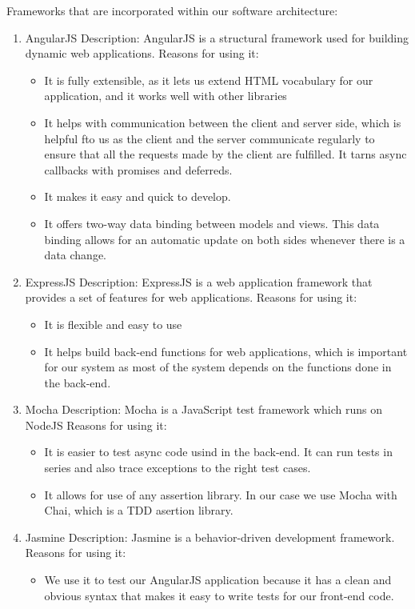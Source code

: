 Frameworks that are incorporated within our software architecture:
	\begin{enumerate}
		\item AngularJS
			Description: AngularJS is a structural framework used for building dynamic web applications.
			Reasons for using it:
			\begin{itemize}
				\item It is fully extensible, as it lets us extend HTML vocabulary for our application, and it works well with other libraries
				\item It helps with communication between the client and server side, which is helpful fto us as the client and the server communicate regularly to ensure that all the requests made by the client are fulfilled. It tarns async callbacks with promises and deferreds. 
				\item It makes it easy and quick to develop.
				\item It offers two-way data binding between models and views. This data binding allows for an automatic update on both sides whenever there is a data change.
			\end{itemize}
			
		\item ExpressJS
			Description: ExpressJS is a web application framework that provides a set of features for web applications.
			Reasons for using it:
			\begin{itemize}
				\item It is flexible and easy to use
				\item It helps build back-end functions for web applications, which is important for our system as most of the system depends on the functions done in the back-end.
			\end{itemize}
			
		\item Mocha 
			Description: Mocha is a JavaScript test framework which runs on NodeJS
			Reasons for using it:
			\begin{itemize}
				\item It is easier to test async code usind in the back-end. It can run tests in series and also trace exceptions to the right test cases.
				\item It allows for use of any assertion library. In our case we use Mocha with Chai, which is a TDD asertion library.
			\end{itemize}
			
		\item Jasmine
			Description: Jasmine is a behavior-driven development framework.
			Reasons for using it:
			\begin{itemize}
				\item We use it to test our AngularJS application because it has a clean and obvious syntax that makes it easy to write tests for our front-end code.
			\end{itemize}
	\end{enumerate}
